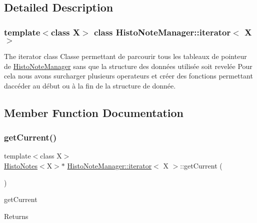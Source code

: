 \subsection{Detailed Description}
\subsubsection*{template$<$class X$>$\newline
class Histo\+Note\+Manager\+::iterator$<$ X $>$}

The iterator class Classe permettant de parcourir tous les tableaux de pointeur de \hyperlink{class_histo_note_manager}{Histo\+Note\+Manager} sans que la structure des données utilisée soit revelée Pour cela nous avons surcharger plusieurs operateurs et créer des fonctions permettant d\textquotesingle{}accéder au début ou à la fin de la structure de donnée. 

\subsection{Member Function Documentation}
\mbox{\label{class_histo_note_manager_1_1iterator_a7bdc515ebe62b710ec796452bc8a4e1b}} 
\subsubsection{\texorpdfstring{get\+Current()}{getCurrent()}}
{\footnotesize\ttfamily template$<$class X$>$ \\
\hyperlink{class_histo_notes}{Histo\+Notes}$<$X$>$$\ast$ \hyperlink{class_histo_note_manager_1_1iterator}{Histo\+Note\+Manager\+::iterator}$<$ X $>$\+::get\+Current (\begin{DoxyParamCaption}{ }\end{DoxyParamCaption})\hspace{0.3cm}{\ttfamily [inline]}}



get\+Current 

\begin{DoxyReturn}{Returns}

\end{DoxyReturn}
\mbox{\label{class_histo_note_manager_1_1iterator_a960a22fd8f1f6a1140bd94bd2a311cb8}} 
